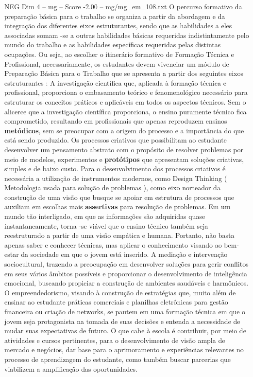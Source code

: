 \begin{textsample}{NEG Dim 4 – mg – Score -2.00 – mg/mg\_em\_108.txt}
O percurso formativo da preparação básica para o trabalho se organiza a partir da abordagem e da integração dos diferentes eixos estruturantes, sendo que as habilidades a eles associadas somam -se a outras habilidades básicas requeridas indistintamente pelo mundo do trabalho e as habilidades específicas requeridas pelas distintas ocupações.
Ou seja, ao escolher o itinerário formativo de Formação Técnica e Profissional, necessariamente, os estudantes devem vivenciar um módulo de Preparação Básica para o Trabalho que se apresenta a partir dos seguintes eixos estruturantes : A investigação científica que, aplicada à formação técnica e profissional, proporciona o embasamento teórico e fenomenológico necessário para estruturar os conceitos práticos e aplicáveis em todos os aspectos técnicos.
Sem o alicerce que a investigação científica proporciona, o ensino puramente técnico fica comprometido, resultando em profissionais que apenas reproduzem ensinos \textbf{metódicos}, sem se preocupar com a origem do processo e a importância do que está sendo produzido.
Os processos criativos que possibilitam ao estudante desenvolver um pensamento abstrato com o propósito de resolver problemas por meio de modelos, experimentos e \textbf{protótipos} que apresentam soluções criativas, simples e de baixo custo.
Para o desenvolvimento dos processos criativos é necessária a utilização de instrumentos modernos, como Design Thinking ( Metodologia usada para solução de problemas ), como eixo norteador da construção de uma visão que busque se apoiar em estrutura de processos que auxiliam em escolhas mais \textbf{assertivas} para resolução de problemas.
Em um mundo tão interligado, em que as informações são adquiridas quase instantaneamente, torna -se viável que o ensino técnico também seja reestruturado a partir de uma visão empática e humana.
Portanto, não basta apenas saber e conhecer técnicas, mas aplicar o conhecimento visando ao bem-estar da sociedade em que o jovem está inserido.
A mediação e intervenção sociocultural, trazendo a preocupação em desenvolver soluções para gerir conflitos em seus vários âmbitos possíveis e proporcionar o desenvolvimento de inteligência emocional, buscando propiciar a construção de ambientes saudáveis e harmônicos.
O empreendedorismo, visando à construção de estratégias que, muito além de ensinar ao estudante práticas comerciais e planilhas eletrônicas para gestão financeira ou criação de networks, se pautem em uma formação técnica em que o jovem seja protagonista na tomada de suas decisões e entenda a necessidade de mudar suas expectativas de futuro.
O que cabe à escola é contribuir, por meio de atividades e cursos pertinentes, para o desenvolvimento de visão ampla de mercado e negócios, dar base para o aprimoramento e experiências relevantes no processo de aprendizagem do estudante, como também buscar parcerias que viabilizem a amplificação das oportunidades.

\end{textsample}
